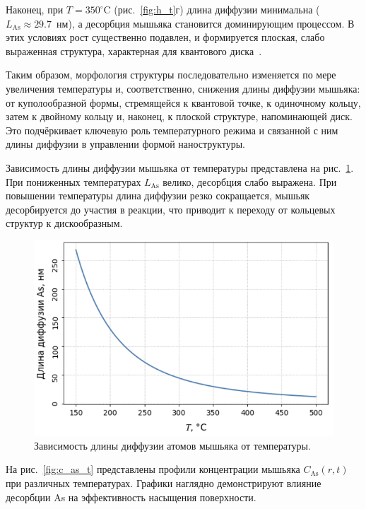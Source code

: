 \documentclass[14pt,oneside]{extarticle}
\begin{document}
Наконец, при $T = 350^\circ$C (рис.~\ref{fig:h_t}г) длина диффузии минимальна ($L_{\text{As}} \approx 29.7$~нм), а десорбция мышьяка становится доминирующим процессом. В этих условиях рост существенно подавлен, и формируется плоская, слабо выраженная структура, характерная для квантового диска~\cite{fan2023evaporation}.

Таким образом, морфология структуры последовательно изменяется по мере увеличения температуры и, соответственно, снижения длины диффузии мышьяка: от куполообразной формы, стремящейся к квантовой точке, к одиночному кольцу, затем к двойному кольцу и, наконец, к плоской структуре, напоминающей диск. Это подчёркивает ключевую роль температурного режима и связанной с ним длины диффузии в управлении формой наноструктуры.

Зависимость длины диффузии мышьяка от температуры представлена на рис.~\ref{fig:diff_length_as}. При пониженных температурах $L_{\text{As}}$ велико, десорбция слабо выражена. При повышении температуры длина диффузии резко сокращается, мышьяк десорбируется до участия в реакции, что приводит к переходу от кольцевых структур к дискообразным.

\begin{figure}[H]
    \begin{center}
    \includegraphics[width=15cm]{images/L_diff_As.png}
    \caption{\label{fig:diff_length_as} Зависимость длины диффузии атомов мышьяка от температуры.}
    \end{center}
\end{figure}

На рис.~\ref{fig:c_as_t} представлены профили концентрации мышьяка $C_{\text{As}}(r, t)$ при различных температурах. Графики наглядно демонстрируют влияние десорбции As на эффективность насыщения поверхности.
\end{document}
